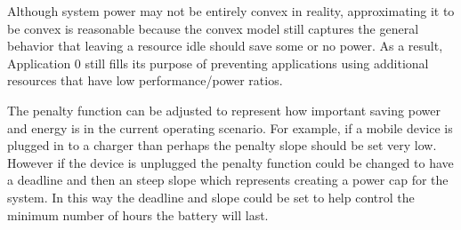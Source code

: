 Although system power may not be entirely convex in reality, approximating it to be convex is reasonable because the convex model still captures the general behavior that leaving a resource idle should save some or no power.  As a result, Application 0 still fills its purpose of preventing applications using additional resources that have low performance/power ratios.

The penalty function can be adjusted to represent how important saving power and energy is in the current operating scenario.  For example, if a mobile device is plugged in to a charger than perhaps the penalty slope should be set very low.  However if the device is unplugged the penalty function could be changed to have a deadline and then an steep slope which represents creating a power cap for the system.  In this way the deadline and slope could be set to help control the minimum number of hours the battery will last.

